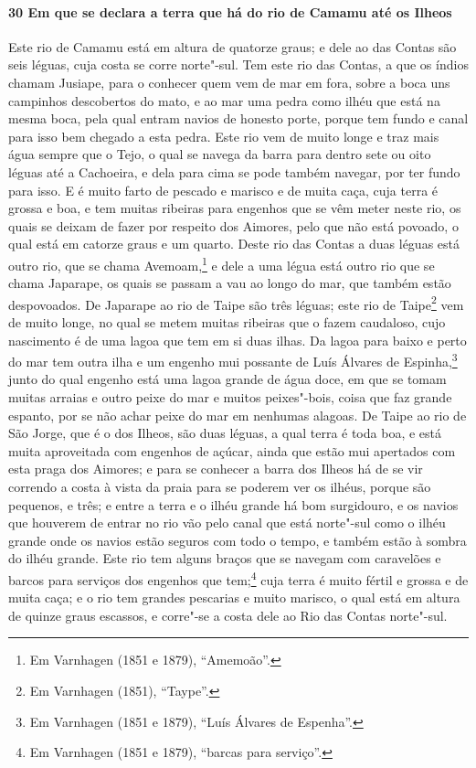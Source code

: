 \paragraph{30 Em que se declara a terra que há do rio de Camamu até os Ilheos}

Este rio de Camamu está em altura de quatorze graus; e dele ao das Contas são seis léguas,
cuja costa se corre norte"-sul. Tem este rio das Contas, a que os índios chamam Jusiape,
para o conhecer quem vem de mar em fora, sobre a boca uns campinhos descobertos do mato, e
ao mar uma pedra como ilhéu que está na mesma boca, pela qual entram navios de honesto
porte, porque tem fundo e canal para isso bem chegado a esta pedra. Este rio vem de muito
longe e traz mais água sempre que o Tejo, o qual se navega da barra para dentro sete ou
oito léguas até a Cachoeira, e dela para cima se pode também navegar, por ter fundo para
isso. E é muito farto de pescado e marisco e de muita caça, cuja terra é grossa e boa, e
tem muitas ribeiras para engenhos que se vêm meter neste rio, os quais se deixam de fazer
por respeito dos Aimores, pelo que não está povoado, o qual está em catorze graus e um
quarto. Deste rio das Contas a duas léguas está outro rio, que se chama Avemoam,\footnote{
Em Varnhagen (1851 e 1879), ``Amemoão''.} e dele a uma légua está outro rio que se chama
Japarape, os quais se passam a vau ao longo do mar, que também estão despovoados. De
Japarape ao rio de Taipe são três léguas; este rio de Taipe\footnote{ Em Varnhagen (1851),
``Taype''.} vem de muito longe, no qual se metem muitas ribeiras que o fazem caudaloso,
cujo nascimento é de uma lagoa que tem em si duas ilhas. Da lagoa para baixo e perto do
mar tem outra ilha e um engenho mui possante de Luís Álvares de Espinha,\footnote{ Em
Varnhagen (1851 e 1879), ``Luís Álvares de Espenha''.} junto do qual engenho está uma
lagoa grande de água doce, em que se tomam muitas arraias e outro peixe do mar e muitos
peixes"-bois, coisa que faz grande espanto, por se não achar peixe do mar em nenhumas
alagoas. De Taipe ao rio de São Jorge, que é o dos Ilheos, são duas léguas, a qual terra é
toda boa, e está muita aproveitada com engenhos de açúcar, ainda que estão mui apertados
com esta praga dos Aimores; e para se conhecer a barra dos Ilheos há de se vir correndo a
costa à vista da praia para se poderem ver os ilhéus, porque são pequenos, e três; e entre
a terra e o ilhéu grande há bom surgidouro, e os navios que houverem de entrar no rio vão
pelo canal que está norte"-sul como o ilhéu grande onde os navios estão seguros com todo o
tempo, e também estão à sombra do ilhéu grande. Este rio tem alguns braços que se navegam
com caravelões e barcos para serviços dos engenhos que tem;\footnote{ Em Varnhagen (1851 e
1879), ``barcas para serviço''.} cuja terra é muito fértil e grossa e de muita caça; e o
rio tem grandes pescarias e muito marisco, o qual está em altura de quinze graus escassos,
e corre"-se a costa dele ao Rio das Contas norte"-sul.

